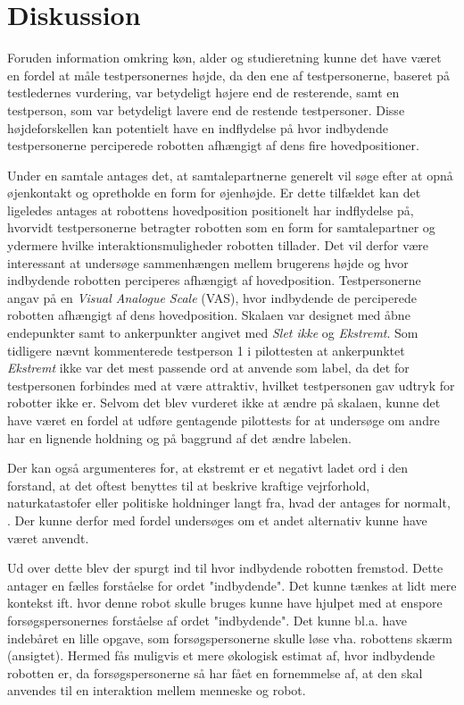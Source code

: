 \section*{Diskussion}
\label{Diskussion}
%
Foruden information omkring køn, alder og studieretning kunne det have været en fordel at måle testpersonernes højde, da den ene af testpersonerne, baseret på testledernes vurdering, var betydeligt højere end de resterende, samt en testperson, som var betydeligt lavere end de restende testpersoner. Disse højdeforskellen kan potentielt have en indflydelse på hvor indbydende testpersonerne perciperede robotten afhængigt af dens fire hovedpositioner. 

Under en samtale antages det, at samtalepartnerne generelt vil søge efter at opnå øjenkontakt og opretholde en form for øjenhøjde. Er dette tilfældet kan det ligeledes antages at robottens hovedposition positionelt har indflydelse på, hvorvidt testpersonerne betragter robotten som en form for samtalepartner og ydermere hvilke interaktionsmuligheder robotten tillader. Det vil derfor være interessant at undersøge sammenhængen mellem brugerens højde og hvor indbydende robotten perciperes afhængigt af hovedposition.\blankline  
%
Testpersonerne angav på en \textit{Visual Analogue Scale} (VAS), hvor indbydende de perciperede robotten afhængigt af dens hovedposition. Skalaen var designet med åbne endepunkter samt to ankerpunkter angivet med \textit{Slet ikke} og \textit{Ekstremt}. Som tidligere nævnt kommenterede testperson 1 i pilottesten at ankerpunktet \textit{Ekstremt} ikke var det mest passende ord at anvende som label, da det for testpersonen forbindes med at være attraktiv, hvilket testpersonen gav udtryk for robotter ikke er. Selvom det blev vurderet ikke at ændre på skalaen, kunne det have været en fordel at udføre gentagende pilottests for at undersøge om andre har en lignende holdning og på baggrund af det ændre labelen.    

 
 
  Der kan også argumenteres for, at ekstremt er et negativt ladet ord i den forstand, at det oftest benyttes til at beskrive kraftige vejrforhold, naturkatastofer eller politiske holdninger langt fra, hvad der antages for normalt, \parencite{Oxford2017}. Der kunne derfor med fordel undersøges om et andet alternativ kunne have været anvendt.

Ud over dette blev der spurgt ind til hvor indbydende robotten fremstod. Dette antager en fælles forståelse for ordet "indbydende". Det kunne tænkes at lidt mere kontekst ift. hvor denne robot skulle bruges kunne have hjulpet med at enspore forsøgspersonernes forståelse af ordet "indbydende". Det kunne bl.a. have indebåret en lille opgave, som forsøgspersonerne skulle løse vha. robottens skærm (ansigtet). Hermed fås muligvis et mere økologisk estimat af, hvor indbydende robotten er, da forsøgspersonerne så har fået en fornemmelse af, at den skal anvendes til en interaktion mellem menneske og robot.


